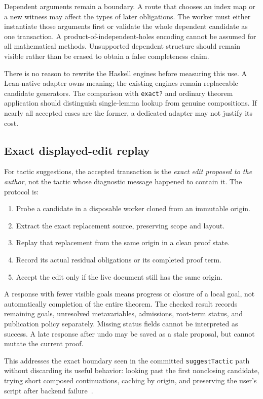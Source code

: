 \documentclass[11pt,a4paper]{article}
\newcommand{\code}[1]{\nolinkurl{#1}}
\theoremstyle{definition}
\begin{document}
Dependent arguments remain a boundary. A route that chooses an index map or a
new witness may affect the types of later obligations. The worker must either
instantiate those arguments first or validate the whole dependent candidate as
one transaction. A product-of-independent-holes encoding cannot be assumed for
all mathematical methods. Unsupported dependent structure should remain visible
rather than be erased to obtain a false completeness claim.

There is no reason to rewrite the Haskell engines before measuring this use.
A Lean-native adapter owns meaning; the existing engines remain replaceable
candidate generators. The comparison with \code{exact?} and ordinary theorem
application should distinguish single-lemma lookup from genuine compositions.
If nearly all accepted cases are the former, a dedicated adapter may not justify
its cost.

\subsection{Exact displayed-edit replay}
For tactic suggestions, the accepted transaction is the \emph{exact edit proposed
to the author}, not the tactic whose diagnostic message happened to contain it.
The protocol is:
\begin{enumerate}
\item Probe a candidate in a disposable worker cloned from an immutable origin.
\item Extract the exact replacement source, preserving scope and layout.
\item Replay that replacement from the same origin in a clean proof state.
\item Record its actual residual obligations or its completed proof term.
\item Accept the edit only if the live document still has the same origin.
\end{enumerate}

A response with fewer visible goals means progress or closure of a local goal,
not automatically completion of the entire theorem. The checked result records
remaining goals, unresolved metavariables, admissions, root-term status, and
publication policy separately. Missing status fields cannot be interpreted as
success. A late response after undo may be saved as a stale proposal, but cannot
mutate the current proof.

This addresses the exact boundary seen in the committed \code{suggestTactic}
path without discarding its useful behavior: looking past the first nonclosing
candidate, trying short composed continuations, caching by origin, and preserving
the user's script after backend failure~\cite{l-main}.
\end{document}
